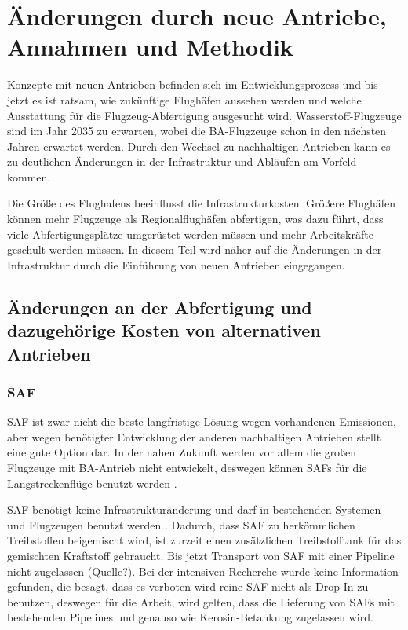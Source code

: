 \chapter{Änderungen durch neue Antriebe, Annahmen und Methodik}
\label{ch:Änderungen durch neue Antriebe, Annahmen und Methodik}

Konzepte mit neuen Antrieben befinden sich im Entwicklungsprozess und bis jetzt es ist ratsam, wie zukünftige Flughäfen aussehen werden
und welche Ausstattung für die Flugzeug-Abfertigung ausgesucht wird. Wasserstoff-Flugzeuge sind im Jahr 2035 zu erwarten, wobei die BA-Flugzeuge
schon in den nächsten Jahren erwartet werden.
Durch den Wechsel zu nachhaltigen Antrieben kann es zu deutlichen Änderungen in der Infrastruktur und Abläufen am Vorfeld kommen.

Die Größe des Flughafens beeinflusst die Infrastrukturkosten. Größere Flughäfen können mehr Flugzeuge als Regionalflughäfen 
abfertigen, was dazu führt, dass viele Abfertigungsplätze umgerüstet werden müssen und 
mehr Arbeitskräfte geschult werden müssen. In diesem Teil wird näher auf die Änderungen in der Infrastruktur durch die Einführung 
von neuen Antrieben eingegangen.

\section{Änderungen an der Abfertigung und dazugehörige Kosten von alternativen Antrieben}
\label{s:Änderungen an der Abfertigung und dazugehörige Kosten von alternativen Antrieben}

\subsection{SAF}
SAF ist zwar nicht die beste langfristige Lösung wegen vorhandenen Emissionen, aber wegen benötigter Entwicklung der anderen nachhaltigen
Antrieben stellt eine gute Option dar. In der nahen Zukunft werden vor allem die großen Flugzeuge mit BA-Antrieb nicht entwickelt, 
deswegen können SAFs für die Langstreckenflüge benutzt werden \cite{dalmia2022powering}.

SAF benötigt keine Infrastrukturänderung und darf in bestehenden Systemen und Flugzeugen benutzt werden \cite{dalmia2022powering}.
Dadurch, dass SAF zu herkömmlichen Treibstoffen beigemischt wird, ist zurzeit einen zusätzlichen Treibstofftank 
für das gemischten Kraftstoff gebraucht. Bis jetzt Transport von SAF mit einer Pipeline nicht zugelassen (Quelle?).
Bei der intensiven Recherche wurde keine Information gefunden, die besagt, dass es verboten wird reine SAF nicht als
Drop-In zu benutzen, deswegen für die Arbeit, wird gelten, dass die Lieferung von SAFs mit bestehenden Pipelines und genauso wie Kerosin-Betankung zugelassen wird.

